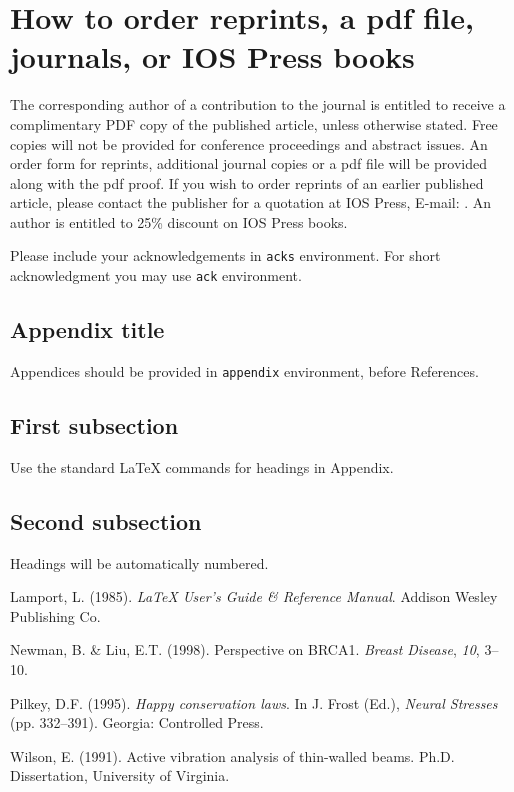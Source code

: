 \documentclass[ao]{iosart2x}
\begin{document}
\section{How to order reprints, a pdf file, journals, or IOS Press
books}
The corresponding author of a contribution to the journal is entitled to receive a complimentary PDF copy of the published article, unless otherwise stated.
Free copies will not be provided for conference proceedings and abstract issues. An order form for reprints,
additional journal copies or a pdf file will be provided along with the pdf proof.
If you wish to order reprints of an earlier published article, please contact the publisher for a quotation at IOS Press, E-mail: .
An author is entitled to 25\% discount on IOS Press books.


\begin{acks}
Please include your acknowledgements in \verb|acks| environment. For short acknowledgment you may use \verb|ack| environment.
\end{acks}

\begin{appendix}
\section{Appendix title}
Appendices should be provided in \verb|appendix| environment, before References.

\subsection{First subsection}
Use the standard \LaTeX{} commands for headings in Appendix.

\subsection{Second subsection}
Headings will be automatically numbered. 
\end{appendix}


\begin{thebibliography}{0}

 Lamport, L. (1985). \textit{\LaTeX{} User's Guide \& Reference Manual}. Addison Wesley Publishing Co.

 Newman, B. \& Liu, E.T. (1998). Perspective on BRCA1. \textit{Breast Disease}, \textit{10}, 3--10. 

 Pilkey, D.F. (1995). \textit{Happy conservation laws}. In J. Frost (Ed.), \textit{Neural Stresses} (pp. 332--391). Georgia: Controlled Press.

 Wilson, E. (1991). Active vibration analysis of thin-walled beams. Ph.D. Dissertation, University of Virginia.

\end{thebibliography}
\end{document}
